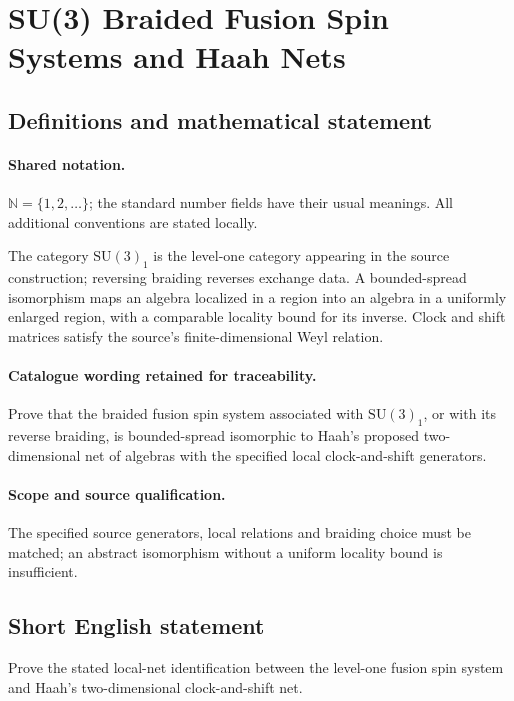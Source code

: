 \documentclass[11pt]{article}
\begin{document}
\section{SU(3) Braided Fusion Spin Systems and Haah Nets}\label{statement}

\subsection{Definitions and mathematical statement}

\paragraph{Shared notation.}$\mathbb N=\{1,2,\ldots\}$; the standard number fields have their usual meanings. All additional conventions are stated locally.


The category $\mathrm{SU}(3)_1$ is the level-one category appearing in the source construction; reversing braiding reverses exchange data. A bounded-spread isomorphism maps an algebra localized in a region into an algebra in a uniformly enlarged region, with a comparable locality bound for its inverse. Clock and shift matrices satisfy the source's finite-dimensional Weyl relation.

\paragraph{Catalogue wording retained for traceability.}
Prove that the braided fusion spin system associated with $\mathrm{SU}(3)_1$, or with its reverse braiding, is bounded-spread isomorphic to Haah's proposed two-dimensional net of algebras with the specified local clock-and-shift generators.

\paragraph{Scope and source qualification.}The specified source generators, local relations and braiding choice must be matched; an abstract isomorphism without a uniform locality bound is insufficient.
\subsection{Short English statement}
Prove the stated local-net identification between the level-one fusion spin system and Haah's two-dimensional clock-and-shift net.
\end{document}
